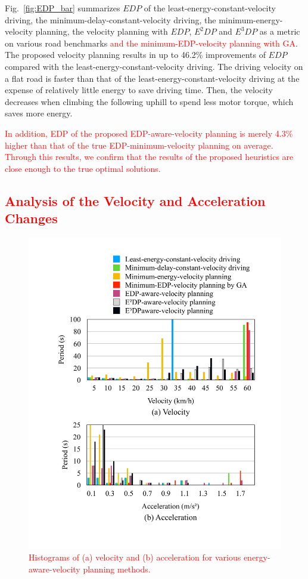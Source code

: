 \documentclass{IEEEtran}
\begin{document}
Fig.~\ref{fig:EDP_bar} summarizes $EDP$ of the least-energy-constant-velocity driving, the minimum-delay-constant-velocity driving, the minimum-energy-velocity planning, the velocity planning with $EDP$, $E^2DP$ and $E^3DP$ as a metric on various road benchmarks \textcolor{red}{and the minimum-EDP-velocity planning with GA}. The proposed velocity planning results in up to 46.2\% improvements of $EDP$ compared with the least-energy-constant-velocity driving. 
The driving velocity on a flat road is faster than that of the least-energy-constant-velocity driving at the expense of relatively little energy to save driving time. Then, the velocity decreases when climbing the following uphill to spend less motor torque, which saves more energy.

\textcolor{red}{In addition, EDP of the proposed EDP-aware-velocity planning is merely 4.3\% higher than that of the true EDP-minimum-velocity planning on average. Through this results, we confirm that the results of the proposed heuristics are close enough to the true optimal solutions.}


\textcolor{red}{\subsection{Analysis of the Velocity and Acceleration Changes}}


\begin{figure}	%
\centering
\includegraphics[width=\hsize]{Figures/Histogram.pdf}
\caption{\textcolor{red}{Histograms of (a) velocity and (b) acceleration for various energy-aware-velocity planning methods.}}
\label{fig:histogram}
\end{figure}
\end{document}
